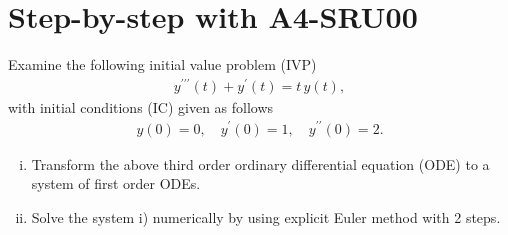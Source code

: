 \documentclass[12pt]{article}
\begin{document}
\newpage
\section{Step-by-step with A4-SRU00}
\begin{exampleboxed}
	Examine the following initial value problem (IVP)
	\begin{align}
		\label{eq:givenODE3rdorder}
		y^{\prime\prime\prime}(t)+y^{\prime}(t)=t\,y(t),
	\end{align}
	with initial conditions (IC) given as follows
	\begin{align}
		\label{eq:ICfromODE}
		y(0)=0,\quad y^{\prime}(0)=1,\quad y^{\prime\prime}(0)=2.
	\end{align}
	\begin{enumerate}[i)]
		\item Transform the above third order
		      ordinary differential equation (ODE) 
		      to a system of first order ODEs.
		\item Solve the system i) numerically by using explicit Euler method with 2 steps.
	\end{enumerate}
\end{exampleboxed}
\end{document}
